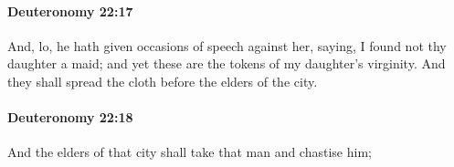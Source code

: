 		\paragraph{Deuteronomy 22:17} %
			\label{DEUTERONOMY-22-17}

			And, lo, he hath given occasions of speech against her, saying, I found not thy daughter a maid; and yet these are the tokens of my daughter's virginity. And they shall spread the cloth before the elders of the city.


		\paragraph{Deuteronomy 22:18} %
			\label{DEUTERONOMY-22-18}

			And the elders of that city shall take that man and chastise him;


